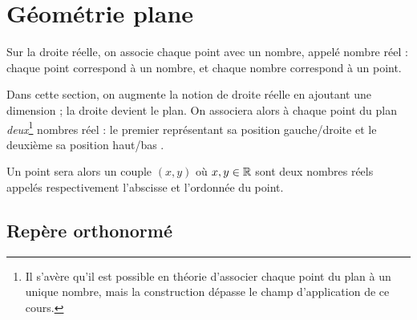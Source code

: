 
\section{Géométrie plane}

Sur la droite réelle, on associe chaque point avec un nombre, appelé nombre réel : chaque point correspond à un nombre, et chaque nombre correspond à un point.

Dans cette section, on augmente la notion de droite réelle en ajoutant une dimension ; la droite devient le plan.
On associera alors à chaque point du plan \emph{deux}\footnote{Il s'avère qu'il est possible en théorie d'associer chaque point du plan à un unique nombre, mais la construction dépasse le champ d'application de ce cours.} nombres réel : le premier représentant sa position \og gauche/droite \fg et le deuxième sa position \og haut/bas \fg.

Un point sera alors un couple $(x,y)$ où $x,y \in \mathbb{R}$ sont deux nombres réels appelés respectivement l'abscisse et l'ordonnée du point.

\subsection{Repère orthonormé}


